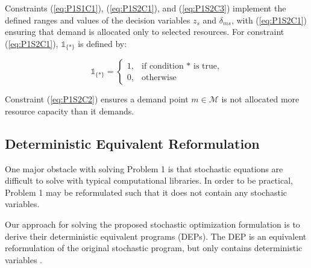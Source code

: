\documentclass[onecolumn,draftcls]{IEEEtran}
\begin{document}
Constraints (\ref{eq:P1S1C1}), (\ref{eq:P1S2C1}), and (\ref{eq:P1S2C3}) implement the defined ranges and values of the decision variables $z_s$ and $\delta_{ms}$, with (\ref{eq:P1S2C1}) ensuring that demand is allocated only to selected resources.  For constraint (\ref{eq:P1S2C1}), $\mathbb{1}_{\{*\}}$ is defined by:

\[ \mathbb{1}_{\{*\}} =
	\begin{cases}
		1,& \text{if condition $*$ is true,}\\
		0,& \text{otherwise}
	\end{cases}
\]

Constraint (\ref{eq:P1S2C2}) ensures a demand point $m \in \mathcal{M}$ is not allocated more resource capacity than it demands.



\subsection{Deterministic Equivalent Reformulation} \label{dep}


One major obstacle with solving Problem 1 is that stochastic equations are difficult to solve with typical computational libraries.  In order to be practical, Problem 1 may be reformulated such that it does not contain any stochastic variables.

Our approach for solving the proposed stochastic optimization formulation is to derive their deterministic equivalent programs (DEPs).  The DEP is an equivalent reformulation of the original stochastic program, but only contains deterministic variables \cite{stochprogramming}.
\end{document}
